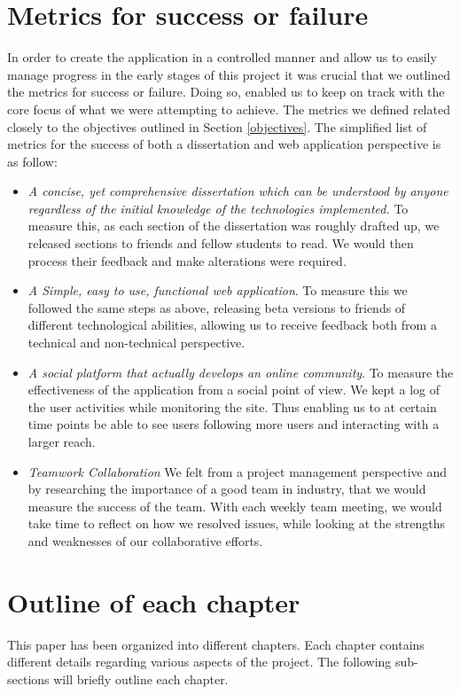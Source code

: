 \section{Metrics for success or failure} \label{metrics}
In order to create the application in a controlled manner and allow us to easily  manage progress in the early stages of this project it was crucial that we outlined the metrics for success or failure. Doing so, enabled us to keep on track with the core focus of what we were attempting to achieve. The metrics we defined related closely to the objectives outlined in Section \ref{objectives}. The simplified list of metrics for the success of both a dissertation and web application perspective is as follow:
\begin{itemize}
  \item \textit{A concise, yet comprehensive dissertation which can be understood by anyone regardless of the initial knowledge of the technologies implemented.} To measure this, as each section of the dissertation was roughly drafted up, we released sections to friends and fellow students to read. We would then process their feedback and make alterations were required.  
  \item \textit{A Simple, easy to use, functional web application}. To measure this we followed the same steps as above, releasing beta versions to friends of different technological abilities, allowing us to receive feedback both from a technical and non-technical perspective.
  \item \textit{A social platform that actually develops an online community}. To measure the effectiveness of the application from a social point of view. We kept a log of the user activities while monitoring the site. Thus enabling us to at certain time points be able to see users following more users and interacting with a larger reach.
  \item \textit{Teamwork Collaboration} We felt from a project management perspective and by researching the importance of a good team in industry, that we would measure the success of the team. With each weekly team meeting, we would take time to reflect on how we resolved issues, while looking at the strengths and weaknesses of our collaborative efforts. 
\end{itemize}


\section{Outline of each chapter}
This paper has been organized into different chapters. Each chapter contains different details regarding various aspects of the project. The following sub-sections will briefly outline each chapter.

